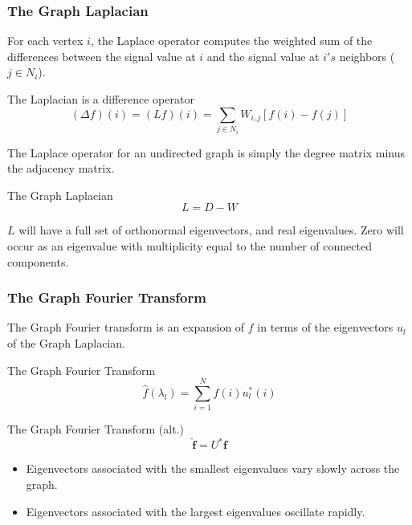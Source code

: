 \documentclass{beamer}
\begin{document}
\begin{frame}
\frametitle{The Graph Laplacian}

For each vertex $i$, the Laplace operator computes the weighted sum of the
differences between the signal value at $i$ and the signal value at $i's$
neighbors ($j \in N_i$). 

\begin{block}{The Laplacian is a difference operator}
  \begin{equation}
    (\Delta f) (i) = (L f) (i) = \sum_{j \in N_i} W_{i, j} [f(i) - f(j)]
  \end{equation}
\end{block}

The Laplace operator for an undirected graph is simply the degree matrix minus the
adjacency matrix.

\begin{block}{The Graph Laplacian}
  \begin{equation}
    L = D - W
  \end{equation}
\end{block}

$L$ will have a full set of orthonormal eigenvectors, and real eigenvalues. Zero
will occur as an eigenvalue with multiplicity equal to the number of connected
components.
\end{frame}

\begin{frame}
  \frametitle{The Graph Fourier Transform}
  The Graph Fourier transform is an expansion of $f$ in terms of the
  eigenvectors $u_l$ of the Graph Laplacian.
  
  \begin{block}{The Graph Fourier Transform}
    \begin{equation}
      \hat{f}(\lambda_l) = \sum_{i=1}^N f(i) u^*_l(i) 
    \end{equation}
  \end{block}

  \begin{block}{The Graph Fourier Transform (alt.)}
    \begin{equation}
      \hat{\mathbf{f}} = U^* \mathbf{f}
    \end{equation}
  \end{block}
  
  \begin{itemize}
    \item Eigenvectors associated with the smallest eigenvalues vary slowly across
      the graph.
    \item Eigenvectors associated with the largest eigenvalues oscillate rapidly.
  \end{itemize}
\end{frame}
\end{document}
